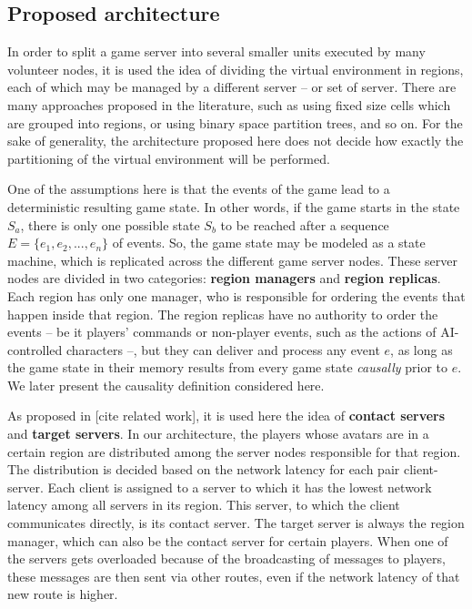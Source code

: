 \documentclass[]{usiinfprospectus}
\begin{document}
\subsection{Proposed architecture} \label{sec:arch}

In order to split a game server into several smaller units executed by many volunteer nodes, it is used the idea of dividing the virtual environment in regions, each of which may be managed by a different server -- or set of server. There are many approaches proposed in the literature, such as using fixed size cells which are grouped into regions, or using binary space partition trees, and so on. For the sake of generality, the architecture proposed here  does not decide how exactly the partitioning of the virtual environment will be performed.

One of the assumptions here is that the events of the game lead to a deterministic resulting game state. In other words, if the game starts in the state $S_{a}$, there is only one possible state $S_{b}$ to be reached after a sequence $E=\{e_{1}, e_{2}, ..., e_{n}\}$ of events. So, the game state may be modeled as a state machine, which is replicated across the different game server nodes. These server nodes are divided in two categories: \textbf{region managers} and \textbf{region replicas}. Each region has only one manager, who is responsible for ordering the events that happen inside that region. The region replicas have no authority to order the events -- be it players' commands or non-player events, such as the actions of AI-controlled characters --, but they can deliver and process any event $e$, as long as the game state in their memory results from every game state \textit{causally} prior to $e$. We later present the causality definition considered here.

As proposed in [cite related work], it is used here the idea of \textbf{contact servers} and \textbf{target servers}. In our architecture, the players whose avatars are in a certain region are distributed among the server nodes responsible for that region. The distribution is decided based on the network latency for each pair client-server. Each client is assigned to a server to which it has the lowest network latency among all servers in its region. This server, to which the client communicates directly, is its contact server. The target server is always the region manager, which can also be the contact server for certain players. When one of the servers gets overloaded because of the broadcasting of messages to players, these messages are then sent via other routes, even if the network latency of that new route is higher.
\end{document}

